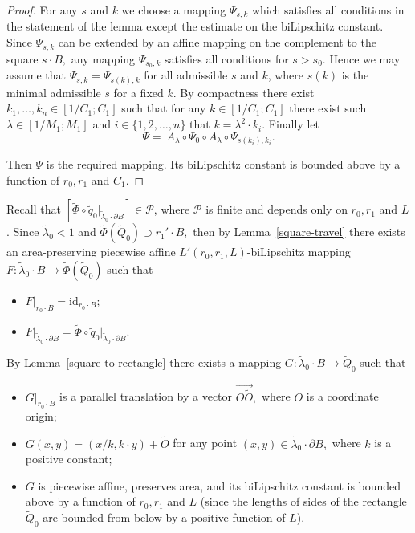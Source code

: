 \documentclass[12pt]{article}
\theoremstyle{definition}
\begin{document}
\begin{proof}
For any $s$ and $k$ we choose a mapping $\Psi_{s,k}$ which satisfies all conditions in the statement of the lemma except the estimate on the biLipschitz constant. Since $\Psi_{s,k}$ can be extended by an affine mapping on the complement to the square $s\cdot B,$ any mapping $\Psi_{s_0, k}$ satisfies all conditions for $s>s_0.$ Hence we may assume that $\Psi_{s, k} = \Psi_{s(k), k}$ for all admissible $s$ and $k$, where $s(k)$ is the minimal admissible $s$ for a fixed $k$. By compactness there exist $k_1,\dots,k_n\in[1/C_1;C_1]$ such that for any $k\in[1/C_1;C_1]$ there exist such $\lambda\in [1/M_1;M_1]$ and $i\in\{1,2,\dots,n\}$ that $k = \lambda^2\cdot k_i.$ Finally let
$$
\Psi=\ A_{\lambda}\circ\Psi_0\circ A_{\lambda}\circ \Psi_{s(k_i), k_i}.
$$

Then $\Psi$ is the required mapping. Its biLipschitz constant is bounded above by a function of $r_0, r_1$ and $C_1.$
\end{proof}

Recall that $\left[\widetilde\Phi\circ\widetilde q_0\big|_{\widetilde\lambda_0\cdot\partial B}\right] \in\mathcal P$, where $\mathcal P$ is finite and depends only on $r_0,r_1$ and $L$. Since $\widetilde\lambda_0<1$ and $\widetilde\Phi\left(\widetilde Q_0\right)\supset r_1'\cdot B,$ then by Lemma~\ref{square-travel} there exists an area-preserving piecewise affine $L'(r_0,r_1,L)$-biLipschitz mapping $F:\widetilde\lambda_0\cdot B\to\widetilde\Phi\left(\widetilde Q_0\right)$ such that
\begin{itemize}
\item $F\big|_{r_0\cdot B} = \mathrm{id}_{r_0\cdot B}$;
\item $F\big|_{\widetilde\lambda_0\cdot\partial B} = \widetilde\Phi\circ\widetilde q_0\big|_{\widetilde\lambda_0\cdot\partial B}.$
\end{itemize}

By Lemma~\ref{square-to-rectangle} there exists a mapping $G:\widetilde\lambda_0\cdot B \to \widetilde Q_0$ such that
\begin{itemize}
\item $G\big|_{r_0\cdot B}$ is a parallel translation by a vector $\overrightarrow{O\widetilde O},$ where $O$ is a coordinate origin;
\item $G (x, y) = (x/k, k\cdot y) + \widetilde O$ for any point $(x,y)\in\widetilde\lambda_0\cdot\partial B,$ where $k$ is a positive constant;
\item $G$ is piecewise affine, preserves area, and its biLipschitz constant is bounded above by a function of $r_0, r_1$ and $L$ (since the lengths of sides of the rectangle $\widetilde Q_0$ are bounded from below by a positive function of $L$).
\end{itemize}
\end{document}
